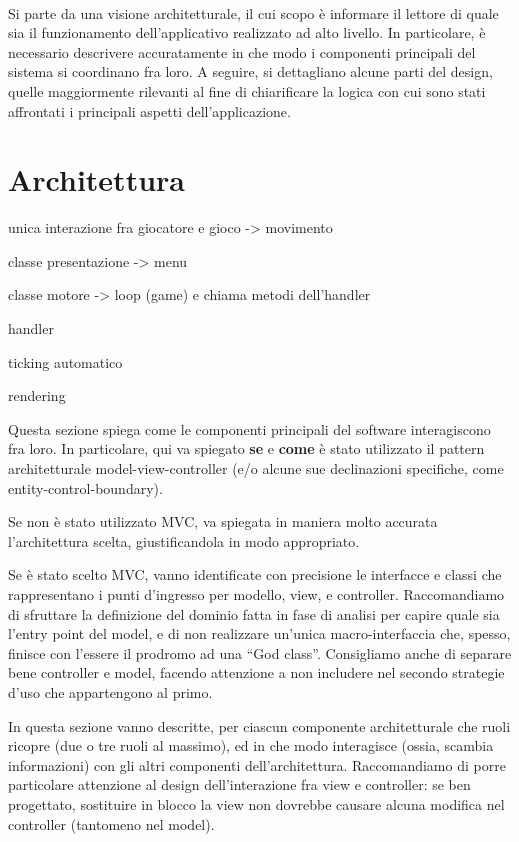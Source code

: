 \documentclass[a4paper,12pt]{report}
\begin{document}
\paragraph{}
		
Si parte da una visione architetturale, il cui scopo è informare il lettore di quale sia il funzionamento dell'applicativo realizzato ad alto livello.
%
In particolare, è necessario descrivere accuratamente in che modo i componenti principali del sistema si coordinano fra loro.
%
A seguire, si dettagliano alcune parti del design, quelle maggiormente rilevanti al fine di chiarificare la logica con cui sono stati affrontati i principali aspetti dell'applicazione.

\section{Architettura}

unica interazione fra giocatore e gioco -> movimento

classe presentazione -> menu

classe motore -> loop (game) e chiama metodi dell'handler

handler

ticking automatico

rendering


Questa sezione spiega come le componenti principali del software interagiscono fra loro.
%
In particolare, qui va spiegato \textbf{se} e \textbf{come} è stato utilizzato il pattern
architetturale model-view-controller (e/o alcune sue declinazioni specifiche, come entity-control-boundary).

Se non è stato utilizzato MVC, va spiegata in maniera molto accurata l'architettura scelta, giustificandola in modo appropriato.

Se è stato scelto MVC, vanno identificate con precisione le interfacce e classi che rappresentano i punti d'ingresso per modello, view, e controller.
Raccomandiamo di sfruttare la definizione del dominio fatta in fase di analisi per capire quale sia l'entry point del model, e di non realizzare un'unica macro-interfaccia che, spesso, finisce con l'essere il prodromo ad una ``God class''.
%
Consigliamo anche di separare bene controller e model, facendo attenzione a non includere nel secondo strategie d'uso che appartengono al primo.

In questa sezione vanno descritte, per ciascun componente architetturale che ruoli ricopre (due o tre ruoli al massimo), ed in che modo interagisce (ossia, scambia informazioni) con gli altri componenti dell'architettura.
%
Raccomandiamo di porre particolare attenzione al design dell'interazione fra view e controller: se ben progettato, sostituire in blocco la view non dovrebbe causare alcuna modifica nel controller (tantomeno nel model).
\end{document}
